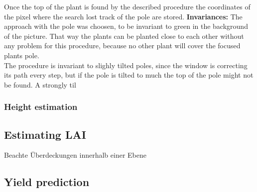 Once the top of the plant is found by the described procedure the coordinates of the pixel where the search lost track of the pole are stored.
\textbf{Invariances:} The approach with the pole was choosen, to be invariant to green in the background of the picture. That way the plants can be planted close to each other without any problem for this procedure, because no other plant will cover the focused plants pole.\\
The procedure is invariant to slighly tilted poles, since the window is correcting its path every step, but if the pole is tilted to much the top of the pole might not be found. A strongly til

\subsubsection{Height estimation}
\subsection{Estimating LAI}
\label{section:EstLAI}
Beachte Überdeckungen innerhalb einer Ebene
\subsection{Yield prediction}

